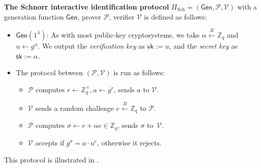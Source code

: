 \documentclass[../lecture-notes.tex]{subfiles}
\begin{document}
\begin{definition}
    \textbf{The Schnorr interactive identification protocol} $\Pi_{\text{Sch}} = (\mathsf{Gen}, \mathcal{P}, \mathcal{V})$ with a generation function $\mathsf{Gen}$, prover $\mathcal{P}$, verifier $\mathcal{V}$ is defined as follows:
    \begin{itemize}
        \item $\mathsf{Gen}(1^{\lambda})$: As with most public-key cryptosystems, we take $\alpha \xleftarrow{R} \mathbb{Z}_q$ and $u \gets g^{\alpha}$. We output the \textit{verification key} as $\mathsf{vk} := u$, and the \textit{secret key} as $\mathsf{sk} := \alpha$.
        \item The protocol between $(\mathcal{P},\mathcal{V})$ is run as follows:
        \begin{itemize}
            \item $\mathcal{P}$ computes $r \gets \mathbb{Z}_q^{\times}, a \gets g^{r}$, sends $a$ to $\mathcal{V}$.
            \item $\mathcal{V}$ sends a random challenge $e \xleftarrow{R} \mathbb{Z}_q$ to $\mathcal{P}$.
            \item $\mathcal{P}$ computes $\sigma \gets r + \alpha e \in \mathbb{Z}_q$, sends $\sigma$ to~$\mathcal{V}$.
            \item $\mathcal{V}$ accepts if $g^{\sigma} = a \cdot u^e$, otherwise it rejects.
        \end{itemize}
    \end{itemize}

    This protocol is illustrated in . 
\end{definition}

\vspace{-6mm}
\end{document}
